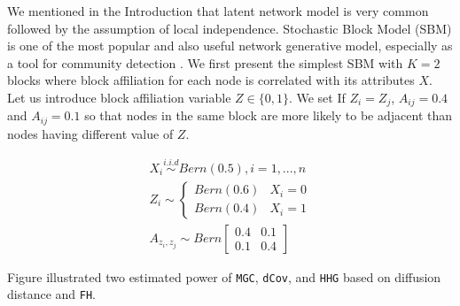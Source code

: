 \documentclass[12pt]{article}
\theoremstyle{definition}
\begin{document}
We mentioned in the Introduction that latent network model is very common followed by the assumption of local independence. Stochastic Block Model (SBM) is one of the most popular and also useful network generative model, especially as a tool for community detection \citep{karrer2011stochastic}. We first present the simplest SBM with $K = 2$ blocks where block affiliation for each node is correlated with its attributes $X$. Let us introduce block affiliation variable $Z \in \{ 0, 1 \}$. We set If $Z_{i}  = Z_{j}$, $A_{ij} = 0.4$ and $A_{ij} = 0.1$ so that nodes in the same block are more likely to be adjacent than nodes having different value of $Z$. 
	
\begin{equation}
\label{eq:twoSBM}
\begin{gathered}
	X_{i} \overset{i.i.d}{\sim} Bern(0.5), i = 1,... , n \\ 
	Z_{i}  \sim  \left\{  \begin{array}{cc} Bern(0.6) & X_{i} = 0 \\ Bern(0.4) & X_{i} = 1  \end{array} \right. \\
	A_{z_{i}, z_{j}} \sim Bern \left[  \begin{array}{cc}   0.4 & 0.1  \\ 0.1 & 0.4 \end{array}  \right]
	\end{gathered}
\end{equation}
	
Figure \label{fig:twoSBM} illustrated two estimated power of \texttt{MGC}, \texttt{dCov}, and \texttt{HHG} based on diffusion distance and \texttt{FH}. 
\end{document}
